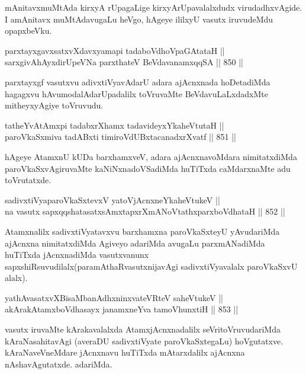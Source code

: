 \begin{artha}
mAnitavxmuMtAda kirxyA rUpagaLige kirxyArUpavalalxdudx virudadhxvAgide. I amAnitavx muMtAdavugaLu heVgo, hAgeye ililxyU vasutx iruvudeMdu opapxbeVku.
\end{artha}

\begin{shl}
parxtayxgavxsatxvXdavxyamapi tadaboVdhoVpaGAtataH || \\
sarxgivAhAyxdirUpeVNa parxthateV BeVdavanamxqqSA \hfill || 850 ||  
\end{shl}

\begin{artha}
parxtayxgf vasutxvu adivxtiVyavAdarU adara ajAcnxnada hoDetadiMda hagagxvu hAvumodalAdarUpadalilx toVruvaMte BeVdavuLaLxdadxMte mitheyxyAgiye toVruvudu.
\end{artha}

\begin{shl}
tatheYvA\s \s tAmx\s pi tadabxrXhamx tadavideyxYkaheVtutaH || \\
paroVkaSxmiva tadABxti timiroVdUBxtacanadxrXvatf \hfill || 851 ||  
\end{shl}

\begin{artha}
hAgeye AtamxnU kUDa barxhamxveV, adara ajAcnxnavoMdara nimitatxdiMda paroVkaSxvAgiruvaMte kaNiNxnadoVSadiMda huTiTxda caMdarxnaMte adu toVrutatxde.
\end{artha}

\begin{shl}
sadivxtiVyaparoVkaSxtevxV yatoV\s jAcnxneYkaheVtukeV || \\
na vasutx sapxqqshatasatxsAmxtapxrXmANoVtathxparxboVdhataH \hfill || 852 ||  
\end{shl}

\begin{artha}
Atamxnalilx sadivxtiVyatavxvu barxhamxna paroVkaSxteyU yAvudariMda ajAcnxna nimitatxdiMda Agiveyo adariMda avugaLu parxmANadiMda huTiTxda jAcnxnadiMda vasutxvanunx sapxshiRsuvudilalx(paramAthaRvasutxnijavAgi sadivxtiVyavalalx paroVkaSxvU alalx).
\end{artha}

\begin{shl}
yathAvasatxvXBisaMbanAdhxninxvateVRteV saheVtukeV || \\
akArakAtamxboVdhasayx janamxneYva tamoVhunxtiH \hfill || 853 ||  
\end{shl}

\begin{artha}
vasutx iruvaMte kArakavalalxda AtamxjAcnxnadalilx seVritoVruvudariMda kAraNasahitavAgi (averaDU sadivxtiVyate paroVkaSxtegaLu) hoVgutatxve. kAraNaveVneMdare jAcnxnavu huTiTxda mAtarxdalilx ajAcnxna nAshavAgutatxde. adariMda.
\end{artha}

